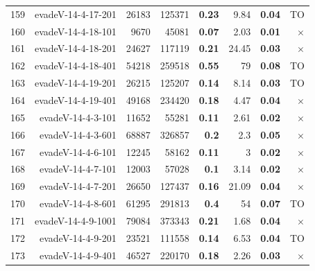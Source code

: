\begin{longtable}{lrr@{\hskip 12pt}r@{\hskip 12pt}r@{\hskip 12pt}r@{\hskip 12pt}r@{\hskip 12pt}r}
159 & \multirow{1}{*}{evadeV-14-4-17-201} & \multirow{1}{*}{26183} & \multirow{1}{*}{125371} & \textbf{0.23} & 9.84 & \textbf{0.04} & TO \\
160 & \multirow{1}{*}{evadeV-14-4-18-101} & \multirow{1}{*}{9670} & \multirow{1}{*}{45081} & \textbf{0.07} & 2.03 & \textbf{0.01} & $\times$ \\
161 & \multirow{1}{*}{evadeV-14-4-18-201} & \multirow{1}{*}{24627} & \multirow{1}{*}{117119} & \textbf{0.21} & 24.45 & \textbf{0.03} & $\times$ \\
162 & \multirow{1}{*}{evadeV-14-4-18-401} & \multirow{1}{*}{54218} & \multirow{1}{*}{259518} & \textbf{0.55} & 79 & \textbf{0.08} & TO \\
163 & \multirow{1}{*}{evadeV-14-4-19-201} & \multirow{1}{*}{26215} & \multirow{1}{*}{125207} & \textbf{0.14} & 8.14 & \textbf{0.03} & TO \\
164 & \multirow{1}{*}{evadeV-14-4-19-401} & \multirow{1}{*}{49168} & \multirow{1}{*}{234420} & \textbf{0.18} & 4.47 & \textbf{0.04} & $\times$ \\
165 & \multirow{1}{*}{evadeV-14-4-3-101} & \multirow{1}{*}{11652} & \multirow{1}{*}{55281} & \textbf{0.11} & 2.61 & \textbf{0.02} & $\times$ \\
166 & \multirow{1}{*}{evadeV-14-4-3-601} & \multirow{1}{*}{68887} & \multirow{1}{*}{326857} & \textbf{0.2} & 2.3 & \textbf{0.05} & $\times$ \\
167 & \multirow{1}{*}{evadeV-14-4-6-101} & \multirow{1}{*}{12245} & \multirow{1}{*}{58162} & \textbf{0.11} & 3 & \textbf{0.02} & $\times$ \\
168 & \multirow{1}{*}{evadeV-14-4-7-101} & \multirow{1}{*}{12003} & \multirow{1}{*}{57028} & \textbf{0.1} & 3.14 & \textbf{0.02} & $\times$ \\
169 & \multirow{1}{*}{evadeV-14-4-7-201} & \multirow{1}{*}{26650} & \multirow{1}{*}{127437} & \textbf{0.16} & 21.09 & \textbf{0.04} & $\times$ \\
170 & \multirow{1}{*}{evadeV-14-4-8-601} & \multirow{1}{*}{61295} & \multirow{1}{*}{291813} & \textbf{0.4} & 54 & \textbf{0.07} & TO \\
171 & \multirow{1}{*}{evadeV-14-4-9-1001} & \multirow{1}{*}{79084} & \multirow{1}{*}{373343} & \textbf{0.21} & 1.68 & \textbf{0.04} & $\times$ \\
172 & \multirow{1}{*}{evadeV-14-4-9-201} & \multirow{1}{*}{23521} & \multirow{1}{*}{111558} & \textbf{0.14} & 6.53 & \textbf{0.04} & TO \\
173 & \multirow{1}{*}{evadeV-14-4-9-401} & \multirow{1}{*}{46527} & \multirow{1}{*}{220170} & \textbf{0.18} & 2.26 & \textbf{0.03} & $\times$ \\

\end{longtable}
